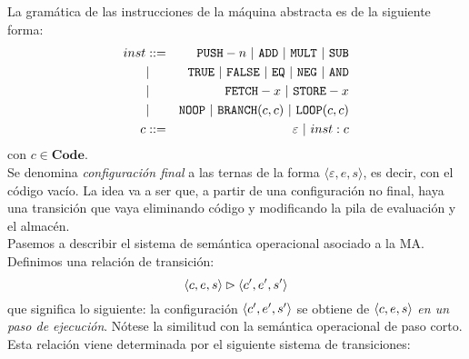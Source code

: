 La gramática de las instrucciones de la máquina abstracta es de la siguiente forma: 
\begin{eqnarray*}
    inst &::=& \n{PUSH}-n\ |\ \n{ADD}\ |\ \n{MULT}\ |\ \n{SUB} \\
        &|& \n{TRUE}\ |\ \n{FALSE}\ |\ \n{EQ}\ |\ \n{NEG}\ |\ \n{AND}\\
        &|& \n{FETCH}-x\ |\ \n{STORE}-x\\
        &|& \n{NOOP}\ |\ \n{BRANCH}(c,c)\ |\ \n{LOOP}(c,c)\\
    c  &::=& \varepsilon\ |\ inst : c
\end{eqnarray*}
con $c \in \mathbf{Code}$.
\\


Se denomina \textit{configuración final} a las ternas de la forma $\langle \varepsilon, e, s\rangle$, es decir, con el código vacío. La idea va a ser que, a partir de una configuración no final, haya una transición que vaya eliminando código y modificando la pila de evaluación y el almacén.
\\

Pasemos a describir el sistema de semántica operacional asociado a la MA. Definimos una relación de transición:
\[
    \langle c, e, s \rangle \rhd \langle c', e', s' \rangle
\]
que significa lo siguiente: la configuración $\langle c', e', s' \rangle$ se obtiene de $\langle c, e, s \rangle$ \textit{en un paso de ejecución}. Nótese la similitud con la semántica operacional de paso corto. Esta relación viene determinada por el siguiente sistema de transiciones:

